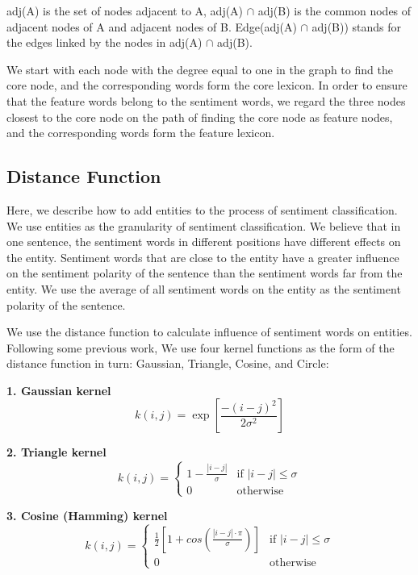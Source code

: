 \documentclass[runningheads]{llncs}
\begin{document}
adj(A) is the set of nodes adjacent to A, adj(A) $\cap$ adj(B) is the common nodes of adjacent nodes of A and adjacent nodes of B. Edge(adj(A) $\cap$ adj(B)) stands for the edges linked by the nodes in adj(A) $\cap$ adj(B).

We start with each node with the degree equal to one in the graph to find the core node, and the corresponding words form the core lexicon. In order to ensure that the feature words belong to the sentiment words, we regard the three nodes closest to the core node on the path of finding the core node as feature nodes, and the corresponding words form the feature lexicon.

\subsection{Distance Function}
Here, we describe how to add entities to the process of sentiment classification. We use entities as the granularity of sentiment classification. We believe that in one sentence, the sentiment words in different positions have different effects on the entity. Sentiment words that are close to the entity have a greater influence on the sentiment polarity of the sentence than the sentiment words far from the entity. We use the average of all sentiment words on the entity as the sentiment polarity of the sentence.

We use the distance function to calculate influence of sentiment words on entities. Following some previous work, We use four kernel functions as the form of the distance function in turn: Gaussian, Triangle, Cosine, and Circle:

\textbf{1. Gaussian kernel}
\begin{equation}
    k(i,j) = \exp\left[\frac{-(i-j)^2}{2\sigma^2}\right]
\end{equation}

\textbf{2. Triangle kernel}
\begin{equation}
k(i,j)=\begin{cases}
1-\frac{|i-j|}{\sigma} &\mbox{if $|i-j|\leq \sigma$}\\
0 &\mbox{otherwise}
\end{cases}
\end{equation}

\textbf{3. Cosine (Hamming) kernel}
\begin{equation}
k(i,j)=\begin{cases}
\frac{1}{2}\left[1+cos\left(\frac{|i-j|\cdot\pi}{\sigma}\right)\right] &\mbox{if $|i-j|\leq \sigma$}\\
0 &\mbox{otherwise}
\end{cases}
\end{equation}
\end{document}
